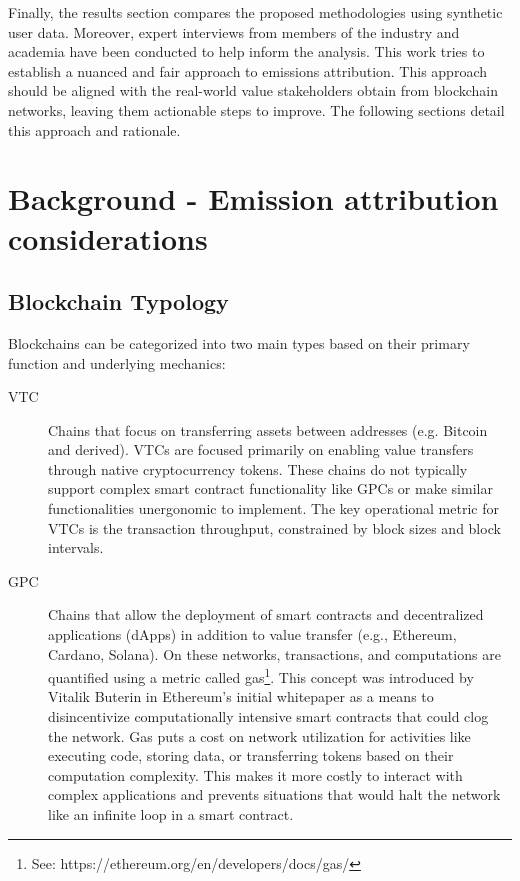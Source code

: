 \documentclass[11pt]{report}
\begin{document}
Finally, the results section compares the proposed methodologies using synthetic user data. Moreover, expert interviews from members of the industry and academia have been conducted to help inform the analysis. This work tries to establish a nuanced and fair approach to emissions attribution. This approach should be aligned with the real-world value stakeholders obtain from blockchain networks, leaving them actionable steps to improve. The following sections detail this approach and rationale.

\section{Background - Emission attribution considerations}

\subsection{Blockchain Typology \label{sec:blockchain_typology}}
Blockchains can be categorized into two main types based on their primary function and underlying mechanics:

\begin{description}
    \item[\ac{VTC}] Chains that focus on transferring assets between addresses (e.g. Bitcoin and derived). VTCs are focused primarily on enabling value transfers through native cryptocurrency tokens. These chains do not typically support complex smart contract functionality like GPCs or make similar functionalities unergonomic to implement. The key operational metric for VTCs is the transaction throughput, constrained by block sizes and block intervals.

    \item[\ac{GPC}] Chains that allow the deployment of smart contracts and decentralized applications (dApps) in addition to value transfer (e.g., Ethereum, Cardano, Solana). On these networks, transactions, and computations are quantified using a metric called gas\footnote{See: https://ethereum.org/en/developers/docs/gas/}. This concept was introduced by Vitalik Buterin in Ethereum's initial whitepaper \cite{buterinEthereumNextgenerationSmart} as a means to disincentivize computationally intensive smart contracts that could clog the network. Gas puts a cost on network utilization for activities like executing code, storing data, or transferring tokens based on their computation complexity. This makes it more costly to interact with complex applications and prevents situations that would halt the network like an infinite loop in a smart contract.
\end{description}
\end{document}
